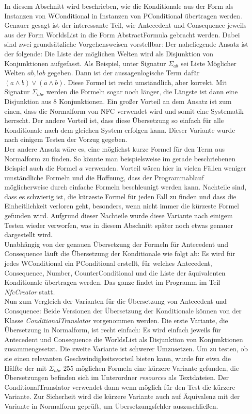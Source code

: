 \documentclass[12pt,a4paper]{article}
\begin{document}
In diesem Abschnitt wird beschrieben, wie die Konditionale aus der Form als Instanzen von WConditional in Instanzen von PConditional übertragen werden. Genauer gesagt ist der interessante Teil, wie Antecedent und Consequence jeweils aus der Form WorldsList in die Form AbstractFormula gebracht werden. Dabei sind zwei grundsätzliche Vorgehensweisen vorstellbar: Der naheliegende Ansatz ist der folgende: Die Liste der möglichen Welten wird als Disjunktion von Konjunktionen aufgefasst. Als Beispiel, unter Signatur $\Sigma_{ab}$ sei Liste Möglicher Welten $ab, !ab$ gegeben. Dann ist der aussagenlogische Term dafür $(a \wedge b) \vee (\overline{a}\wedge b)$. Diese Formel ist recht umständlich, aber korrekt. Mit Signatur $\Sigma_{abc}$  werden die Formeln sogar noch länger, die Längste ist dann eine Disjunktion aus 8 Konjunktionen. Ein großer Vorteil an dem Ansatz ist zum einen, dass die Normalform von NFC verwendet wird und somit eine Systematik herrscht. Der andere Vorteil ist, dass diese Übersetzung so einfach für alle Konditionale nach dem gleichen System erfolgen kann. Dieser Variante wurde nach einigem Testen der Vorzug gegeben.\\
Der andere Ansatz wäre es, eine möglichst kurze Formel für den Term aus Normalform zu finden. So könnte man beispielsweise im gerade beschriebenen Beispiel auch die Formel $a$ verwenden. Vorteil wären hier in vielen Fällen weniger umständliche Formeln und die Hoffnung, dass der Programmablauf möglicherweise durch einfache Formeln beschleunigt werden kann. Nachteile sind, dass es schwierig ist, die kürzeste Formel für jeden Fall zu finden und dass die Einheitlichkeit verloren geht, besonders, wenn nicht immer die kürzeste Formel gefunden wird. Aufgrund dieser Nachteile wurde diese Variante nach einigem Testen wieder verworfen, was in diesem Abschnitt später noch etwas genauer dargestellt wird.\\
Unabhängig von der genauen Übersetzung der Formeln für Antecedent und Consequence läuft die Übersetzung der Konditionale wie folgt ab: Es wird für jedes WConditional ein PConditional erstellt, für welches Antecedent, Consequence, Number, CounterConditional und die Liste der äquivalenten Konditionale übertragen werden. Das ganze findet im Programm im Teil \textit{NfcCreator} statt. \\
Nun zum Vergleich der Varianten für die Übersetzung von Antecedent und Consquence: Beide  Versionen der Übersetzung der Konditionale können von der Klasse \textit{ConditionalTranslator} vorgenommen werden. Die erste Variante, die Übersetzung in Normalform, ist recht einfach: Es wird einfach jeweils für Antecedent und Consequence die WorldsList als Disjunktion von Konjunktionen zusammengesetzt. Die zweite Variante ist schwerer Umzusetzen. Um zu testen, ob sie einen relevanten Geschwindigkeitsvorteil bieten kann, wurde für etwa die Hälfte der mit $\Sigma_{abc}$ 255 möglichen Formeln eine kürzere Variante gefunden, die Übersetzungen befinden sich im Unterordner \textit{resources} als Textdateien. Der ConditionalTranslator verwendet dann wenn möglich für den Test die kürzere Variante. Zur Sicherheit wird die kürzere Variante auch auf Äquivalenz mit der Variante in Normalform geprüft, um Übersetzungsfehler auszuschließen. \\
\end{document}
